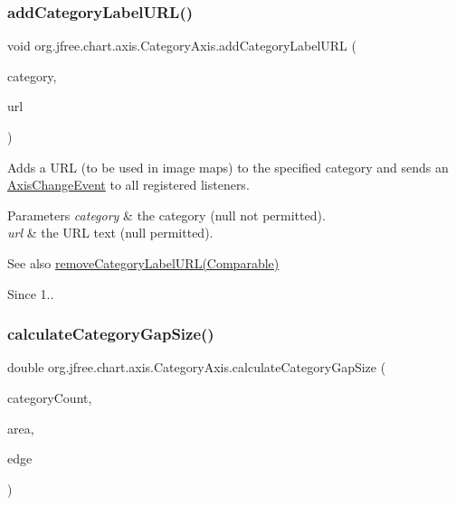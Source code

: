 \subsubsection{\texorpdfstring{add\+Category\+Label\+U\+R\+L()}{addCategoryLabelURL()}}
{\footnotesize\ttfamily void org.\+jfree.\+chart.\+axis.\+Category\+Axis.\+add\+Category\+Label\+U\+RL (\begin{DoxyParamCaption}\item[{Comparable}]{category,  }\item[{String}]{url }\end{DoxyParamCaption})}

Adds a U\+RL (to be used in image maps) to the specified category and sends an \mbox{\hyperlink{}{Axis\+Change\+Event}} to all registered listeners.


\begin{DoxyParams}{Parameters}
{\em category} & the category ({\ttfamily null} not permitted). \\
\hline
{\em url} & the U\+RL text ({\ttfamily null} permitted).\\
\hline
\end{DoxyParams}
\begin{DoxySeeAlso}{See also}
\mbox{\hyperlink{classorg_1_1jfree_1_1chart_1_1axis_1_1_category_axis_a37bd2f2448d6ba0903b8b4d0ee98adf4}{remove\+Category\+Label\+U\+R\+L(\+Comparable)}}
\end{DoxySeeAlso}
\begin{DoxySince}{Since}
1.. 
\end{DoxySince}
\mbox{\label{classorg_1_1jfree_1_1chart_1_1axis_1_1_category_axis_a3d29f9812a5354d4bf42c8f46643ca49}} 
\subsubsection{\texorpdfstring{calculate\+Category\+Gap\+Size()}{calculateCategoryGapSize()}}
{\footnotesize\ttfamily double org.\+jfree.\+chart.\+axis.\+Category\+Axis.\+calculate\+Category\+Gap\+Size (\begin{DoxyParamCaption}\item[{int}]{category\+Count,  }\item[{Rectangle2D}]{area,  }\item[{Rectangle\+Edge}]{edge }\end{DoxyParamCaption})\hspace{0.3cm}{\ttfamily [protected]}}

